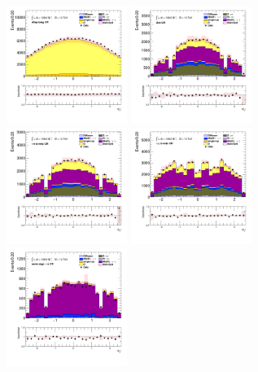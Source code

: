 		\begin{figure}[!htp]
			\begin{center}    
			\includegraphics[width=0.35\textwidth]{chapters/chapter6_HPlus/images/taulep/lep_0_eta_DILEP_BTAG.png}
			\includegraphics[width=0.35\textwidth]{chapters/chapter6_HPlus/images/taulep/lep_0_eta_ZEE.png} \\
			\includegraphics[width=0.35\textwidth]{chapters/chapter6_HPlus/images/taulep/lep_0_eta_TAUEL_BVETO.png} 
			\includegraphics[width=0.35\textwidth]{chapters/chapter6_HPlus/images/taulep/lep_0_eta_TAUMU_BVETO.png} \\
			\includegraphics[width=0.35\textwidth]{chapters/chapter6_HPlus/images/taulep/lep_0_eta_SS_TAUEL.png} 

\end{center}
\end{figure}
